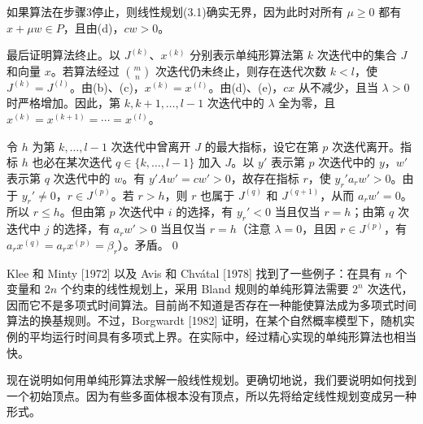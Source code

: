 如果算法在步骤3停止，则线性规划(3.1)确实无界，因为此时对所有 $\mu\ge0$ 都有 $x+\mu w\in P$，且由(d)，$cw>0$。

最后证明算法终止。以 $J^{(k)}$、$x^{(k)}$ 分别表示单纯形算法第 $k$ 次迭代中的集合 $J$ 和向量 $x$。若算法经过 $\binom mn$ 次迭代仍未终止，则存在迭代次数 $k<l$，使 $J^{(k)}=J^{(l)}$。由(b)、(c)，$x^{(k)}=x^{(l)}$。由(d)、(e)，$cx$ 从不减少，且当 $\lambda>0$ 时严格增加。因此，第 $k,k+1,\ldots,l-1$ 次迭代中的 $\lambda$ 全为零，且 $x^{(k)}=x^{(k+1)}=\cdots=x^{(l)}$。

令 $h$ 为第 $k,\ldots,l-1$ 次迭代中曾离开 $J$ 的最大指标，设它在第 $p$ 次迭代离开。指标 $h$ 也必在某次迭代 $q\in\{k,\ldots,l-1\}$ 加入 $J$。以 $y'$ 表示第 $p$ 次迭代中的 $y$，$w'$ 表示第 $q$ 次迭代中的 $w$。有 $y'Aw'=cw'>0$，故存在指标 $r$，使 $y_r'a_rw'>0$。由于 $y_r'\ne0$，$r\in J^{(p)}$。若 $r>h$，则 $r$ 也属于 $J^{(q)}$ 和 $J^{(q+1)}$，从而 $a_rw'=0$。所以 $r\le h$。但由第 $p$ 次迭代中 $i$ 的选择，有 $y_r'<0$ 当且仅当 $r=h$；由第 $q$ 次迭代中 $j$ 的选择，有 $a_rw'>0$ 当且仅当 $r=h$（注意 $\lambda=0$，且因 $r\in J^{(p)}$，有 $a_rx^{(q)}=a_rx^{(p)}=\beta_r$）。矛盾。\qed

Klee 和 Minty [1972] 以及 Avis 和 Chvátal [1978] 找到了一些例子：在具有 $n$ 个变量和 $2n$ 个约束的线性规划上，采用 Bland 规则的单纯形算法需要 $2^n$ 次迭代，因而它不是多项式时间算法。目前尚不知道是否存在一种能使算法成为多项式时间
算法的换基规则。不过，Borgwardt [1982] 证明，在某个自然概率模型下，随机实例的平均运行时间具有多项式上界。在实际中，经过精心实现的单纯形算法也相当快。

现在说明如何用单纯形算法求解一般线性规划。更确切地说，我们要说明如何找到一个初始顶点。因为有些多面体根本没有顶点，所以先将给定线性规划变成另一种形式。

